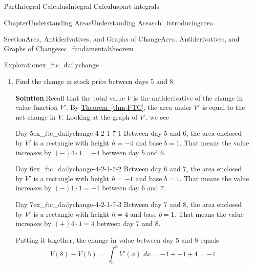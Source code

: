 \documentclass[oneside,10pt,]{tufte-book}
\newcommand{\blocktitlefont}{\relax}
\newcommand{\xreffont}{\relax}
\numberwithin{equation}{chapter}
\newcommand{\intdx}[1]{{\,\int#1\,\,dx}}
\newcommand{\dint}[1]{\displaystyle\intdx{#1}}
\begin{document}
\begin{partptx}{Part}{Integral Calculus}{}{Integral Calculus}{}{}{part-integrals}
\begin{chapterptx}{Chapter}{Understanding Areas}{}{Understanding Areas}{}{}{ch_introducingarea}
\begin{sectionptx}{Section}{Area, Antiderivatives, and Graphs of Change}{}{Area, Antiderivatives, and Graphs of Change}{}{}{sec_fundamentaltheorem}
\begin{exploration}{Exploration}{}{ex_ftc_dailychange}
\begin{enumerate}[font=\bfseries,label=(\alph*),ref=\alph*]
\begin{image}{0.25}{0.5}{0.25}{}
{
}%
\end{image}%
\item{}Find the change in stock price between days 5 and 8.%
\par\smallskip%
\noindent\textbf{\blocktitlefont Solution}.\hypertarget{ex_ftc_dailychange-4-2}{}\quad{}Recall that the total value \(V\) is the antiderivative of the change in value function  \(V'\). By \hyperref[thm-FTC]{Theorem~{\xreffont\ref{thm-FTC}}}, the area under \(V'\) is equal to the net change in \(V\).  Looking at the graph of \(V'\), we see%
\begin{descriptionlist}
\begin{dlimedium}{Day 5}{ex_ftc_dailychange-4-2-1-7-1}%
Between day 5 and 6, the area enclosed by \(V'\) is a rectangle with height \(h=-4\) and base \(b=1\). That means the value increases by \((-) 4\cdot 1 = -4 \)\textdollar{} between day 5 and 6.%
\end{dlimedium}%
\begin{dlimedium}{Day 6}{ex_ftc_dailychange-4-2-1-7-2}%
Between day 6 and 7, the area enclosed by \(V'\) is a rectangle with height \(h=-1\) and base \(b=1\). That means the value increases by \((-) 1\cdot 1 = -1 \)\textdollar{} between day 6 and 7.%
\end{dlimedium}%
\begin{dlimedium}{Day 7}{ex_ftc_dailychange-4-2-1-7-3}%
Between day 7 and 8, the area enclosed by \(V'\) is a rectangle with height \(h=4\) and base \(b=1\). That means the value increases by \((+) 4\cdot 1 = 4 \)\textdollar{} between day 7 and 8.%
\end{dlimedium}%
\end{descriptionlist}
Putting it together, the change in value between day 5 and 8 equals%
\begin{equation*}
V(8)-V(5) = \dint{_5^8 V'(x) } = -4 + -1 + 4  = -1
\end{equation*}
%
\begin{image}{0.25}{0.5}{0.25}{}%
\end{image}
\end{enumerate}
\end{exploration}
\end{sectionptx}
\end{chapterptx}
\end{partptx}
\end{document}
